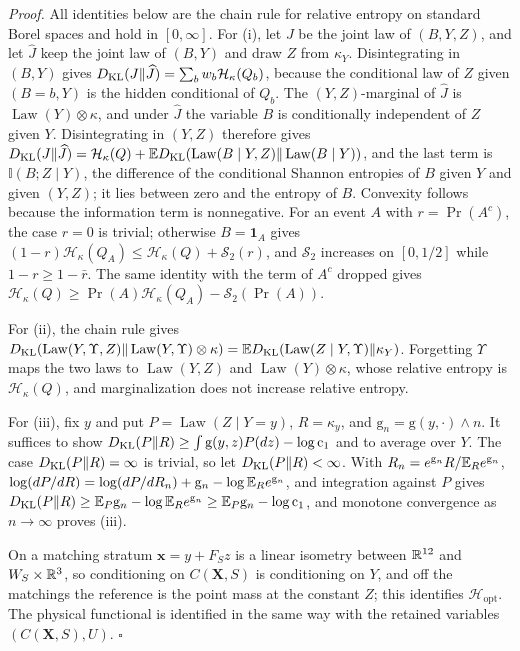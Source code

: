 \noindent\emph{Proof.}
All identities below are the chain rule for relative entropy on standard
Borel spaces and hold in \([0,\infty]\). For (i), let \(J\) be the joint law
of \((B,Y,Z)\), and let \(\widehat J\) keep the joint law of \((B,Y)\) and
draw \(Z\) from \(\kappa_Y\). Disintegrating in \((B,Y)\) gives
\(D_{\mathrm{KL}}(J\Vert\widehat J)=\sum_bw_b\mathcal H_\kappa(Q_b)\), because the
conditional law of \(Z\) given \((B=b,Y)\) is the hidden conditional of
\(Q_b\). The \((Y,Z)\)-marginal of \(\widehat J\) is
\(\operatorname{Law}(Y)\otimes\kappa\), and under \(\widehat J\) the variable
\(B\) is conditionally independent of \(Z\) given \(Y\). Disintegrating in
\((Y,Z)\) therefore gives
\(D_{\mathrm{KL}}(J\Vert\widehat J)=\mathcal H_\kappa(Q)
+\mathbb ED_{\mathrm{KL}}(\operatorname{Law}(B\mid Y,Z)\Vert\operatorname{Law}(B\mid Y))\), and
the last term is \(\mathbb I(B;Z\mid Y)\), the difference of the conditional
Shannon entropies of \(B\) given \(Y\) and given \((Y,Z)\); it lies between
zero and the entropy of \(B\). Convexity follows because the information term
is nonnegative. For an event \(A\) with \(r=\Pr(A^c)\), the case \(r=0\) is
trivial; otherwise \(B=\mathbf 1_A\) gives
\((1-r)\mathcal H_\kappa(Q_A)\le\mathcal H_\kappa(Q)+\mathcal S_2(r)\), and
\(\mathcal S_2\) increases on \([0,1/2]\) while \(1-r\ge1-\bar r\). The
same identity with the term of \(A^c\) dropped gives
\(\mathcal H_\kappa(Q)\ge\Pr(A)\mathcal H_\kappa(Q_A)-\mathcal S_2(\Pr(A))\).

For (ii), the chain rule gives
\(D_{\mathrm{KL}}(\operatorname{Law}(Y,\Upsilon,Z)\Vert\operatorname{Law}(Y,\Upsilon)\otimes\kappa)
=\mathbb ED_{\mathrm{KL}}(\operatorname{Law}(Z\mid Y,\Upsilon)\Vert\kappa_Y)\). Forgetting
\(\Upsilon\) maps the two laws to \(\operatorname{Law}(Y,Z)\) and
\(\operatorname{Law}(Y)\otimes\kappa\), whose relative entropy is
\(\mathcal H_\kappa(Q)\), and marginalization does not increase relative
entropy.

For (iii), fix \(y\) and put \(P=\operatorname{Law}(Z\mid Y=y)\),
\(R=\kappa_y\), and \(\mathrm g_n=\mathrm g(y,\cdot)\wedge n\). It suffices
to show \(D_{\mathrm{KL}}(P\Vert R)\ge\int\mathrm g(y,z)P(dz)-\log\mathrm c_1\) and to
average over \(Y\). The case \(D_{\mathrm{KL}}(P\Vert R)=\infty\) is trivial, so let
\(D_{\mathrm{KL}}(P\Vert R)<\infty\). With
\(R_n=e^{\mathrm g_n}R/\mathbb E_Re^{\mathrm g_n}\),
\(\log(dP/dR)=\log(dP/dR_n)+\mathrm g_n-\log\mathbb E_Re^{\mathrm g_n}\), and
integration against \(P\) gives
\(D_{\mathrm{KL}}(P\Vert R)\ge\mathbb E_P\mathrm g_n-\log\mathbb E_Re^{\mathrm g_n}
\ge\mathbb E_P\mathrm g_n-\log\mathrm c_1\), and monotone convergence as
\(n\to\infty\) proves (iii).

On a matching stratum \(\mathbf x=y+F_Sz\) is a linear isometry between
\(\mathbb R^{12}\) and \(W_S\times\mathbb R^3\), so conditioning on \(C(\mathbf X,S)\) is
conditioning on \(Y\), and off the matchings the reference is the point mass
at the constant \(Z\); this identifies \(\mathcal H_{\mathrm{opt}}\). The
physical functional is identified in the same way with the retained variables
\((C(\mathbf X,S),U)\). \(\square\)


